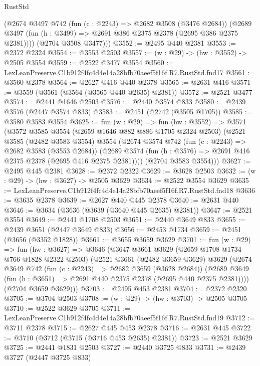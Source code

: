 \begin{lexlean}{RustStd}
\begin{coremodule}
        (@2674
          @3497
          @742
          (fun (c : @2243) => @2682 @3508 (@3476 @2684))
          (@2689 @3497 (fun (h : @3499) => @2691 @386 @2375 @2378 (@2695 @386 @2375 @2381))))
        (@2704 @3508 @3477)))
@3552 := @2495 @440 @2381
@3553 := @2372 @2324
@3554 := @3553 @2503
@3557 := (w : @29) -> (hw : @3552) -> @2505 @3554
@3559 := @2522 @3477 @3554
@3560 := LexLeanPreserve.C1b912f4fc4d4e14a28bfb70aeef5f16f.R7.RustStd.fnd17
@3561 := @3560 @2378
@3564 := @2627 @416 @440 @2378
@3565 := @2631 @416
@3571 := @3559 (@3561 (@3564 (@3565 @440 @2635) @2381))
@3572 := @2521 @3477
@3574 := @2441 @1646 @2503
@3576 := @2440 @3574 @833
@3580 := @2439 @3576 (@2447 @3574 @833)
@3583 := @2451 (@2742 (@3505 @1705))
@3585 := @3580 @3583 @3554
@3625 := fun (w : @29) =>
  fun (hw : @3552) =>
  @3571
    (@3572
      @3585
      @3554
      (@2659 @1646 @882 @886 @1705 @2324 @2503)
      (@2521
        @3585
        (@2482 @3583 @3554)
        @3554
        (@2674
          @3574
          @742
          (fun (c : @2243) => @2682 @3583 (@3553 @2684))
          (@2689 @3574 (fun (h : @3576) => @2691 @416 @2375 @2378 (@2695 @416 @2375 @2381))))
        (@2704 @3583 @3554)))
@3627 := @2495 @445 @2381
@3628 := @2372 @2322
@3629 := @3628 @2503
@3632 := (w : @29) -> (hw : @3627) -> @2505 @3629
@3634 := @2522 @3554 @3629
@3635 := LexLeanPreserve.C1b912f4fc4d4e14a28bfb70aeef5f16f.R7.RustStd.fnd18
@3636 := @3635 @2378
@3639 := @2627 @440 @445 @2378
@3640 := @2631 @440
@3646 := @3634 (@3636 (@3639 (@3640 @445 @2635) @2381))
@3647 := @2521 @3554
@3649 := @2441 @1708 @2503
@3651 := @2440 @3649 @833
@3655 := @2439 @3651 (@2447 @3649 @833)
@3656 := @2453 @1734
@3659 := @2451 (@3656 (@3352 @1828))
@3661 := @3655 @3659 @3629
@3701 := fun (w : @29) =>
  fun (hw : @3627) =>
  @3646
    (@3647
      @3661
      @3629
      (@2659 @1708 @1734 @766 @1828 @2322 @2503)
      (@2521
        @3661
        (@2482 @3659 @3629)
        @3629
        (@2674
          @3649
          @742
          (fun (c : @2243) => @2682 @3659 (@3628 @2684))
          (@2689 @3649 (fun (h : @3651) => @2691 @440 @2375 @2378 (@2695 @440 @2375 @2381))))
        (@2704 @3659 @3629)))
@3703 := @2495 @453 @2381
@3704 := @2372 @2320
@3705 := @3704 @2503
@3708 := (w : @29) -> (hw : @3703) -> @2505 @3705
@3710 := @2522 @3629 @3705
@3711 := LexLeanPreserve.C1b912f4fc4d4e14a28bfb70aeef5f16f.R7.RustStd.fnd19
@3712 := @3711 @2378
@3715 := @2627 @445 @453 @2378
@3716 := @2631 @445
@3722 := @3710 (@3712 (@3715 (@3716 @453 @2635) @2381))
@3723 := @2521 @3629
@3725 := @2441 @1831 @2503
@3727 := @2440 @3725 @833
@3731 := @2439 @3727 (@2447 @3725 @833)

\end{coremodule}
\end{lexlean}
